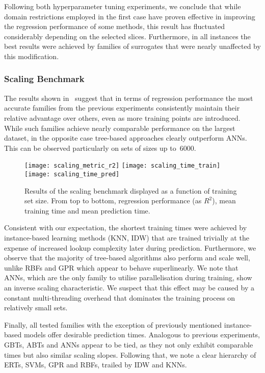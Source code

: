 Following both hyperparameter tuning experiments, we conclude that while domain
restrictions employed in the first case have proven effective in improving the
regression performance of some methods, this result has fluctuated considerably
depending on the selected slices. Furthermore, in all instances the best
results were achieved by families of surrogates that were nearly unaffected by
this modification.


\subsubsection{Scaling Benchmark}

The results shown in~ suggest that in terms of regression
performance the most accurate families from the previous experiments
consistently maintain their relative advantage over others, even as
more training points are introduced. While such families achieve nearly comparable
performance on the largest dataset, in the opposite case tree-based approaches
clearly outperform ANNs. This can be observed
particularly on sets of sizes up to~\num{6000}.

\begin{figure}
	\centering
	\texttt{[image: scaling\_metric\_r2]}
	\texttt{[image: scaling\_time\_train]}
	\texttt{[image: scaling\_time\_pred]}
	\caption{Results of the scaling benchmark displayed as a function of
	training set size. From top to bottom, regression performance (as $R^2$),
	mean training time and mean prediction time.}
	\label{fig:scaling}
\end{figure}

Consistent with our expectation, the shortest training times were achieved by
instance-based learning methods (KNN, IDW) that
are trained trivially at the expense of increased lookup complexity later during prediction.
Furthermore, we observe that the majority of tree-based algorithms also perform
and scale well, unlike RBFs and GPR which appear to behave superlinearly. We note that ANNs,
which are the only family to utilise parallelisation during training, show an
inverse scaling characteristic. We suspect that this effect may be caused
by a constant multi-threading overhead that dominates the training process
on relatively small sets.

Finally, all tested families with the exception of previously mentioned instance-based
models offer desirable prediction times. Analogous to previous experiments,
GBTs, ABTs and ANNs appear to be tied, as they not only exhibit
comparable times but also similar scaling slopes. Following that, we note a
clear hierarchy of ERTs, SVMs, GPR and RBFs, trailed by IDW and KNNs.


